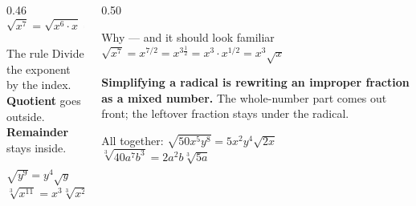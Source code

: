 \documentclass[aspectratio=169, 11pt]{beamer}
\begin{document}
\begin{frame}[t, plain]
  \begin{columns}[T]
    \begin{column}{0.46\textwidth}
      \[ \sqrt{x^{7}}=\sqrt{x^{6}\cdot x}=x^{3}\sqrt{x} \]
      \vspace{-6pt}
      \begin{block}{The rule}
        \centering Divide the exponent by the index. \\[3pt]
        \textbf{Quotient} goes outside. \\
        \textbf{Remainder} stays inside.
      \end{block}
      \vspace{3pt}
      \footnotesize
      $\sqrt{y^{9}}=y^{4}\sqrt y$ \qquad $\sqrt[3]{x^{11}}=x^{3}\sqrt[3]{x^{2}}$
    \end{column}
    \begin{column}{0.50\textwidth}
      \begin{block}{Why --- and it should look familiar}
        \centering
        $\displaystyle \sqrt{x^{7}}=x^{7/2}=x^{3\frac12}=x^{3}\cdot x^{1/2}=x^{3}\sqrt x$
      \end{block}
      \vspace{4pt}
      {\footnotesize \textcolor{goldacc}{\textbf{Simplifying a radical is rewriting an improper
      fraction as a mixed number.}} The whole-number part comes out front; the leftover fraction
      stays under the radical.}
      \vspace{5pt}

      {\footnotesize All together: \; $\sqrt{50x^{5}y^{8}}=5x^{2}y^{4}\sqrt{2x}$ \\[3pt]
      \qquad\qquad\quad $\sqrt[3]{40a^{7}b^{3}}=2a^{2}b\sqrt[3]{5a}$}
    \end{column}
  \end{columns}
\end{frame}
\end{document}

